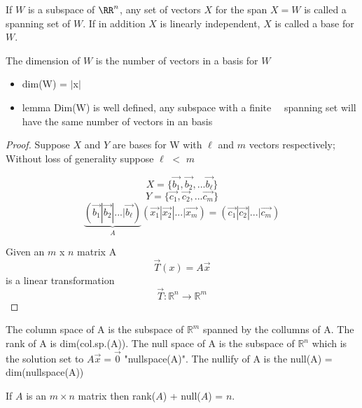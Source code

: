 

\begin{definition}If $W$ is a subspace of $\RR^n$, any set of vectors $X$ for the span $X = W$ is called a spanning set of $W$. If in addition $X$ is linearly independent, $X$ is called a base for $W$.
\end{definition}
 
\begin{definition}The dimension of $W$ is the number of vectors in a basis for $W$
\begin{itemize} 
  \item dim(W) = $|$x$|$ 
  \item lemma Dim(W) is well defined, any subspace with a finite    \ \ spanning set will have the same number of vectors in an basis
\end{itemize}
\end{definition}
\begin{proof}Suppose $X$ and $Y$ are bases for W with $\ell$ and $m$ vectors respectively; Without loss of generality suppose $\ell$ $<$ $m$

\[X = \{ \vec{b_1} , \vec{b_2}, ... \vec{b_\ell} \}\]
\[Y = \{ \vec{c_1} , \vec{c_2}, ... \vec{c_m} \}\]
\[\underbrace{\left( \vec{b_1} | \vec{b_2}| ... | \vec{b_\ell} \right)}_A \left( \vec{x_1} | \vec{x_2}| ... | \vec{x_m} \right) = \left( \vec{c_1} | \vec{c_2}| ... | \vec{c_m} \right)\]

Given an $m$ x $n$ matrix A
\[ \vec{T}(x) = A\vec{x}\]
is a linear transformation \[\vec{T}:\mathbb{R}^n \to \mathbb{R}^m \]
\end{proof}
\begin{definition}The column space of A is the subspace of $\mathbb{R}^m$ spanned by the collumns of A. The rank of A is dim(col.sp.(A)). The null space of A is the subspace of $\mathbb{R}^n$ which is the solution set to $A\vec{x} = \vec{0}$ "nullspace(A)". The nullify of A is the null(A) = dim(nullspace(A))
\end{definition}

\begin{theorem} If $A$ is an $m \times n$ matrix then rank($A$) + null($A$) = $n$.
\end{theorem}



